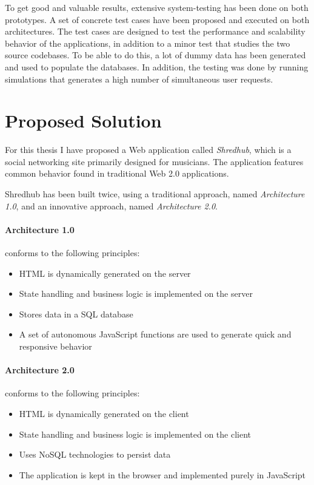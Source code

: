 To get good and valuable results, extensive system-testing has been done on both prototypes. A set of concrete test cases have been proposed and executed on both architectures. The test cases are designed to test the performance and scalability behavior of the applications, in addition to a minor test that studies the two source codebases. To be able to do this, a lot of dummy data has been generated and used to populate the databases. In addition, the testing was done by running simulations that generates a high number of simultaneous user requests. 

\section{Proposed Solution}
For this thesis I have proposed a Web application called \textit{Shredhub}, which is a social networking site primarily designed for musicians. The application features common behavior found in traditional Web 2.0 applications.

Shredhub has been built twice, using a traditional approach, named \textit{Architecture 1.0}, and an innovative approach, named \textit{Architecture 2.0}.
\paragraph{Architecture 1.0} conforms to the following principles:
\begin{itemize}
\item{} HTML is dynamically generated on the server
\item{} State handling and business logic is implemented on the server
\item{} Stores data in a SQL database
\item{} A set of autonomous JavaScript functions are used to generate quick and responsive behavior
\end{itemize}

\paragraph{Architecture 2.0} conforms to the following principles:
\begin{itemize}
\item{} HTML is dynamically generated on the client
\item{} State handling and business logic is implemented on the client
\item{} Uses NoSQL technologies to persist data
\item{} The application is kept in the browser and implemented purely in JavaScript
\end{itemize}

